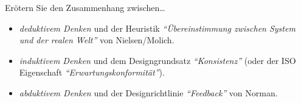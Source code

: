 \begin{exercise}
  Erötern Sie den Zusammenhang zwischen\ldots
  \begin{itemize}
    \item{
      \textit{deduktivem Denken} und der Heuristik \textit{\enquote{Übereinstimmung zwischen
      System und der realen Welt}} von Nielsen/Molich.
    }
    \item{
      \textit{induktivem Denken} und dem Designgrundsatz \textit{\enquote{Konsistenz}} 
      (oder der ISO Eigenschaft \textit{\enquote{Erwartungskonformität}}).
    }
    \item{
      \textit{abduktivem Denken} und der Designrichtlinie \textit{\enquote{Feedback}} von Norman.
    }
  \end{itemize}
  \vspace{0.5cm}
\end{exercise}

